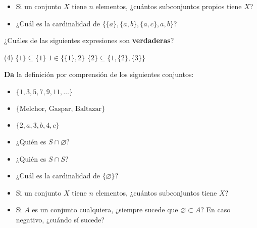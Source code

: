\documentclass[oneside]{style}
\begin{document}
\begin{questions}[label=\protect\circled{\bfseries\arabic*}]
\begin{itemize}
        \item Si un conjunto $X$ tiene $n$ elementos, ¿cuántos subconjuntos 
        propios tiene $X$?

        \item ¿Cuál es la cardinalidad de $\{\{a\}, \{a,b\}, \{a,c\}, a, b\}$?
    \end{itemize}

    \question ¿Cuáles de las siguientes expresiones son \textbf{verdaderas}?
    \begin{tasks}(4)
        \task $\{1\} \subseteq \{1\}$
        \task $1 \in \{\{1\}, 2\}$
        \task $\{2\} \subseteq \{1, \{2\}, \{3\}\}$
    \end{tasks}


    \question \textbf{Da} la definición por comprensión de los siguientes 
    conjuntos:
    \begin{itemize}
        \item $\{1,3,5,7,9,11, \ldots\}$
        \item $\{\text{Melchor, Gaspar, Baltazar}\}$
        \item $\{2,a,3,b,4,c\}$
    \end{itemize}

    \begin{itemize}
        \item ¿Quién es $S \cap \varnothing$?
        \item ¿Quién es $S \cap S$?
    \end{itemize}


    \begin{itemize}
        \item ¿Cuál es la cardinalidad de $\{\varnothing\}$?
        \item Si un conjunto $X$ tiene $n$ elementos, ¿cuántos subconjuntos
        tiene $X$?
        \item Si $A$ es un conjunto cualquiera, ¿siempre sucede que
        $\varnothing \subset A$? En caso negativo, ¿cuándo sí sucede?
    \end{itemize}


\end{questions}
\end{document}
